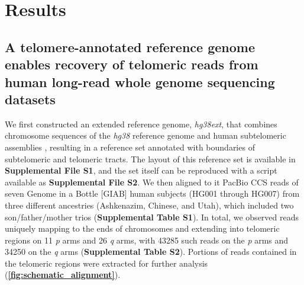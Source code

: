 \documentclass{article}
\begin{document}
\section*{Results} 

\subsection*{A telomere-annotated reference genome enables recovery of telomeric reads from human long-read whole genome sequencing datasets}
    We first constructed an extended reference genome, \textit{hg38ext},
        that combines chromosome sequences of the \textit{hg38} reference genome \parencite{grch38,hg38}
            and human subtelomeric assemblies \parencite{riethman2014},
        resulting in a reference set annotated with boundaries of subtelomeric and telomeric tracts.
        The layout of this reference set is available in \textbf{Supplemental File S1},
            and the set itself can be reproduced with a script available as \textbf{Supplemental File S2}.
    We then aligned to it PacBio CCS reads of seven Genome in a Bottle [GIAB] \parencite{giab} human subjects (HG001 through HG007)
        from three different ancestries (Ashkenazim, Chinese, and Utah),
            which included two son/father/mother trios (\textbf{Supplemental Table S1}).
        In total, we observed reads uniquely mapping to the ends of chromosomes and extending into telomeric regions
            on 11 \textit{p} arms and 26 \textit{q} arms,
                with 43\textendash{}285 such reads on the \textit{p} arms
                and 34\textendash{}250 on the \textit{q} arms
                    (\textbf{Supplemental Table S2}).
    Portions of reads contained in the telomeric regions were extracted for further analysis (\textbf{\autoref{fig:schematic_alignment}}).
\end{document}
